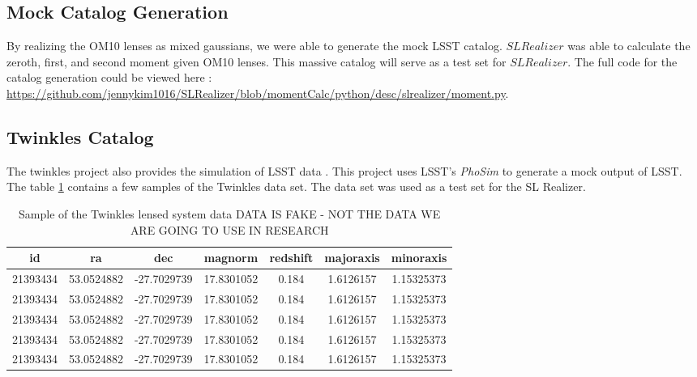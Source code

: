 \documentclass[\docopts]{\docclass}
\begin{document}
\subsection{Mock Catalog Generation}
\label{subsection:MCG}

By realizing the OM10 lenses as mixed gaussians, we were able to generate the mock LSST catalog. $SL Realizer$ was able to calculate the zeroth, first, and second moment given OM10 lenses. This massive catalog will serve as a test set for $SL Realizer$. The full code for the catalog generation could be viewed here : \url{https://github.com/jennykim1016/SLRealizer/blob/momentCalc/python/desc/slrealizer/moment.py}.

\subsection{Twinkles Catalog}

The twinkles project also provides the simulation of LSST data \cite{Twinkles}. This project uses LSST's \textit{PhoSim} to generate a mock output of LSST. The table \ref{table:1} contains a few samples of the Twinkles data set. The data set was used as a test set for the SL Realizer.
 
\begin{table}[h!]
\centering
\begin{tabular}{||c c c c c c c||} 
 \hline
 id & ra & dec & magnorm & redshift & majoraxis & minoraxis   \\ [0.5ex] 
 \hline\hline
 21393434 & 53.0524882 & -27.7029739 & 17.8301052 & 0.184 & 1.6126157 & 1.15325373 \\ 
 21393434 & 53.0524882 & -27.7029739 & 17.8301052 & 0.184 & 1.6126157 & 1.15325373 \\
 21393434 & 53.0524882 & -27.7029739 & 17.8301052 & 0.184 & 1.6126157 & 1.15325373 \\
 21393434 & 53.0524882 & -27.7029739 & 17.8301052 & 0.184 & 1.6126157 & 1.15325373 \\
 21393434 & 53.0524882 & -27.7029739 & 17.8301052 & 0.184 & 1.6126157 & 1.15325373 \\ [1ex] 
 \hline
\end{tabular}
\caption{Sample of the Twinkles lensed system data \cite{Twinkles} DATA IS FAKE - NOT THE DATA WE ARE GOING TO USE IN RESEARCH}
\label{table:1}
\end{table}

\label{sec:catalog_generation}

\end{document}
